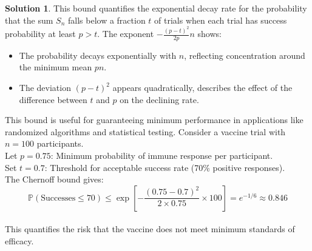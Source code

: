 \documentclass[12pt]{article}
\theoremstyle{definition}
\newtheorem*{solution}{\normalfont\textbf{Solution}}
\newcommand{\prob}{\mathbb{P}}
\begin{document}
\begin{enumerate}[leftmargin=*]
\begin{solution}
            This bound quantifies the exponential decay rate for the probability that the sum \(S_n\) falls below a fraction \(t\) of trials when each trial has success probability at least \(p > t\). The exponent \(-\frac{(p-t)^2}{2p}n\) shows:
            \begin{itemize}
                \item The probability decays exponentially with \(n\), reflecting concentration around the minimum mean \(pn\).
                \item The deviation \((p-t)^2\) appears quadratically, describes the effect of the difference between \(t\) and \(p\) on the declining rate.
            \end{itemize}
            This bound is useful for guaranteeing minimum performance in applications like randomized algorithms and statistical testing. 
            Consider a vaccine trial with \(n = 100\) participants. \\
            Let \(p = 0.75\): Minimum probability of immune response per participant. \\
            Set \(t = 0.7\): Threshold for acceptable success rate (70\% positive responses). \\
            The Chernoff bound gives: \\
            \[
            \prob(\text{Successes} \leq 70) \leq \exp\left[-\frac{(0.75 - 0.7)^2}{2 \times 0.75} \times 100\right] = e^{-1/6} \approx 0.846
            \] \\
            This quantifies the risk that the vaccine does not meet minimum standards of efficacy.        
        \end{solution}


\end{enumerate}
\end{document}

